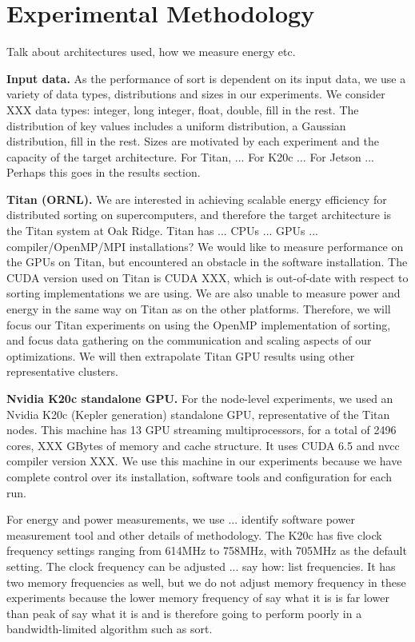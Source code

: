 \section{Experimental Methodology}

{\color{red} Talk about architectures used, how we measure energy etc.}

\noindent
{\bf Input data.}
As the performance of sort is dependent on its input data, we 
use a variety of data types, distributions and sizes in our experiments.
We consider XXX data types: 
integer, long integer, float, double, {\color{red} fill in
the rest.}
The distribution of key values 
includes a uniform distribution, a Gaussian distribution, 
{\color{red} fill in
the rest.}
Sizes are motivated by each experiment and the capacity of the
target architecture.  {\color{red} For Titan, ...  
For K20c ... For Jetson ...  Perhaps this goes in the results section.}

\noindent
{\bf Titan (ORNL).} 
We are interested in 
achieving scalable energy efficiency for distributed
sorting on supercomputers, and therefore the target architecture is the
Titan system at Oak Ridge.  Titan has 
{\color{red}... CPUs ... GPUs ...  compiler/OpenMP/MPI installations?}
We would like to measure performance on the GPUs on Titan, but encountered
an obstacle in the software installation.  
The CUDA version used on Titan is CUDA XXX, which is out-of-date with respect to
sorting implementations we are using.  We are also unable to measure
power and energy in the same way on Titan as on the other platforms.
Therefore, we will focus our
Titan experiments on using the OpenMP implementation of sorting, and focus
data gathering on the communication and scaling aspects of our optimizations.
We will then extrapolate
Titan GPU results using other representative clusters.


\noindent
{\bf Nvidia K20c standalone GPU.}
For the node-level experiments, we used an Nvidia K20c (Kepler 
generation) standalone GPU, representative of the Titan nodes.  
This machine has 13 GPU streaming multiprocessors, 
for a total of 2496 cores, 
XXX GBytes of memory and {\color{red} cache structure.}
It uses CUDA 6.5 and nvcc compiler version XXX.
We use this machine in our experiments because we have complete control 
over its installation, software tools and configuration for each run.

For energy and power measurements, we use {\color{red} 
... identify software power
measurement tool and other details of methodology}.  The K20c has five clock frequency settings ranging from 614MHz to 758MHz, with 705MHz as the default setting.
The clock frequency can be adjusted 
{\color{red} ... say how:
 list frequencies}.  It has two memory frequencies as well, 
but we do not adjust memory frequency in these experiments 
because the lower memory frequency of {\color{red} say what it is}
is far lower than peak of {\color{red} say what it is}
and is therefore going to perform poorly in a bandwidth-limited
algorithm such as sort.

